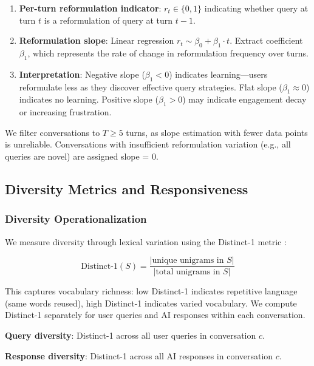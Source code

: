 \begin{enumerate}
\item \textbf{Per-turn reformulation indicator}: $r_t \in \{0, 1\}$ indicating whether query at turn $t$ is a reformulation of query at turn $t-1$.

\item \textbf{Reformulation slope}: Linear regression $r_t \sim \beta_0 + \beta_1 \cdot t$. Extract coefficient $\beta_1$, which represents the rate of change in reformulation frequency over turns.

\item \textbf{Interpretation}: Negative slope ($\beta_1 < 0$) indicates learning---users reformulate less as they discover effective query strategies. Flat slope ($\beta_1 \approx 0$) indicates no learning. Positive slope ($\beta_1 > 0$) may indicate engagement decay or increasing frustration.
\end{enumerate}

We filter conversations to $T \geq 5$ turns, as slope estimation with fewer data points is unreliable. Conversations with insufficient reformulation variation (e.g., all queries are novel) are assigned slope = 0.

\subsection{Diversity Metrics and Responsiveness}

\subsubsection{Diversity Operationalization}

We measure diversity through lexical variation using the Distinct-1 metric \cite{li2016diversity}:

\begin{equation}
\text{Distinct-1}(S) = \frac{|\text{unique unigrams in } S|}{|\text{total unigrams in } S|}
\end{equation}

This captures vocabulary richness: low Distinct-1 indicates repetitive language (same words reused), high Distinct-1 indicates varied vocabulary. We compute Distinct-1 separately for user queries and AI responses within each conversation.

\textbf{Query diversity}: Distinct-1 across all user queries in conversation $c$.

\textbf{Response diversity}: Distinct-1 across all AI responses in conversation $c$.

